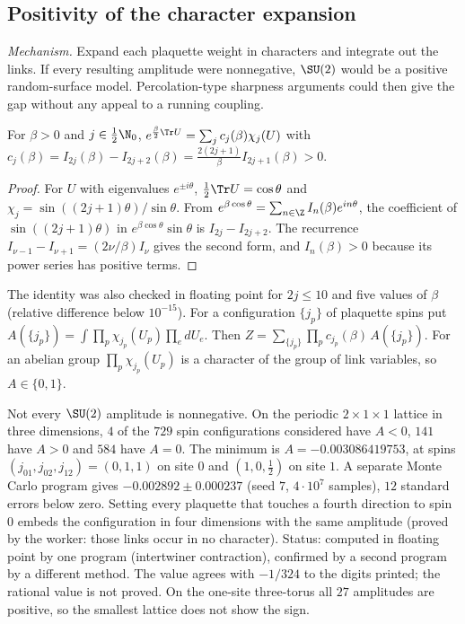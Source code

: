 \subsection{Positivity of the character expansion}\label{neg:sub-dual}

\emph{Mechanism.} Expand each plaquette weight in characters and integrate out the links. If
every resulting amplitude were nonnegative, $\SU(2)$ would be a positive random-surface model.
Percolation-type sharpness arguments could then give the gap without any appeal to a running
coupling.

\begin{lemma}\label{neg:lem-cj}
For $\beta>0$ and $j\in\frac12\N_0$,
$e^{\frac\beta2\Tr U}=\sum_jc_j(\beta)\chi_j(U)$ with
$c_j(\beta)=I_{2j}(\beta)-I_{2j+2}(\beta)=\frac{2(2j+1)}{\beta}I_{2j+1}(\beta)>0$.
\end{lemma}

\begin{proof}
For $U$ with eigenvalues $e^{\pm i\theta}$, $\frac12\Tr U=\cos\theta$ and
$\chi_j=\sin((2j+1)\theta)/\sin\theta$. From $e^{\beta\cos\theta}=\sum_{n\in\Z}I_n(\beta)e^{in\theta}$,
the coefficient of $\sin((2j+1)\theta)$ in $e^{\beta\cos\theta}\sin\theta$ is $I_{2j}-I_{2j+2}$.
The recurrence $I_{\nu-1}-I_{\nu+1}=(2\nu/\beta)I_\nu$ gives the second form, and $I_n(\beta)>0$
because its power series has positive terms.
\end{proof}

The identity was also checked in floating point for $2j\le10$ and five values of $\beta$
(relative difference below $10^{-15}$). For a configuration $\{j_p\}$ of plaquette spins put
$A(\{j_p\})=\int\prod_p\chi_{j_p}(U_p)\prod_e dU_e$. Then
$Z=\sum_{\{j_p\}}\prod_pc_{j_p}(\beta)\,A(\{j_p\})$. For an abelian group $\prod_p\chi_{j_p}(U_p)$
is a character of the group of link variables, so $A\in\{0,1\}$.

\begin{observation}\label{neg:obs-dual}
Not every $\SU(2)$ amplitude is nonnegative. On the periodic $2\times1\times1$ lattice in three
dimensions, $4$ of the $729$ spin configurations considered have $A<0$, $141$ have $A>0$ and
$584$ have $A=0$. The minimum is $A=-0.003086419753$, at spins $(j_{01},j_{02},j_{12})=(0,1,1)$ on
site $0$ and $(1,0,\frac12)$ on site $1$. A separate Monte Carlo program gives
$-0.002892\pm0.000237$ (seed $7$, $4\cdot10^7$ samples), $12$ standard errors below zero.
Setting every plaquette that touches a fourth direction to spin $0$ embeds the configuration in
four dimensions with the same amplitude (proved by the worker: those links occur in no character).
Status: computed in floating point by one program (intertwiner contraction), confirmed by a
second program by a different method. The value agrees with $-1/324$ to the digits printed;
the rational value is not proved. On the one-site three-torus all $27$ amplitudes are positive,
so the smallest lattice does not show the sign.
\end{observation}

